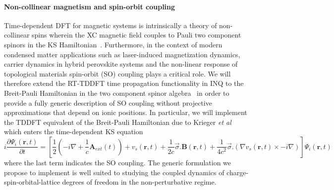\paragraph{ Non-collinear magnetism and spin-orbit coupling} Time-dependent DFT for magnetic systems is intrinsically a theory of non-collinear spins wherein the XC magnetic field couples to Pauli two component spinors in the KS Hamiltonian~\cite{Krieger2015}. Furthermore, in the context of modern condensed matter applications such as laser-induced magnetization dynamics, carrier dynamics in hybrid perovskite systems and the non-linear response of topological materials spin-orbit (SO) coupling plays a critical role. We will therefore extend the RT-TDDFT time propagation functionality in \textsc{INQ} to the Breit-Pauli Hamiltonian in the two component spinor algebra~\cite{Breit1932} in order to provide a fully generic description of SO coupling without projective approximations that depend on ionic positions. In particular, we will implement the TDDFT equivalent of the Breit-Pauli Hamiltonian due to Krieger \textit{et al}~\cite{Krieger2015} which enters the time-dependent KS equation
\begin{equation*}
i\frac{\partial\Psi_i(\textbf{r},t)}{\partial t} = [ \frac{1}{2} ( -i\nabla + \frac{1}{c}\textbf{A}_{ext} (t) )  + v_s(\textbf{r},t)  + \frac{1}{2c} \overrightarrow{\sigma}.\textbf{B}(\textbf{r},t)  + \frac{1}{4c^2}\overrightarrow{\sigma}.(\nabla v_s(\textbf{r},t) \times -i\nabla )] \Psi_i(\textbf{r},t)
\end{equation*}
where the last term indicates the SO coupling. The generic formulation we propose to implement is well suited to studying the coupled dynamics of charge-spin-orbital-lattice degrees of freedom in the non-perturbative regime.  
  


